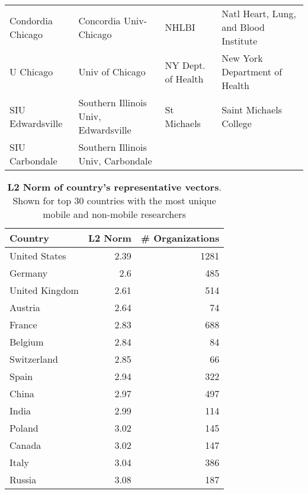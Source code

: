 \documentclass[12pt]{article} %
\begin{document}
\begin{table}[ht]
\begin{adjustwidth}{-2cm}{}
\begin{tabular}{llll}
  Condordia Chicago & Concordia Univ-Chicago & NHLBI & Natl Heart, Lung, and Blood Institute \\
  U Chicago & Univ of Chicago & NY Dept. of Health & New York Department of Health \\
  SIU Edwardsville & Southern Illinois Univ, Edwardsville & St Michaels & Saint Michaels College \\
  SIU Carbondale & Southern Illinois Univ, Carbondale &  &  \\
   \hline
\end{tabular}
\endgroup
\end{adjustwidth}
\end{table}


\newpage

\begin{table}[]
\centering
\caption{\textbf{L2 Norm of country's representative vectors}.
			 Shown for top 30 countries with the most unique mobile and non-mobile researchers}
\label{table:supp:norm}
\begin{tabular}{lrr}
\textbf{Country} & \textbf{L2 Norm} & \textbf{\# Organizations} \\ \hline
United States    & 2.39             & 1281                      \\
Germany          & 2.6              & 485                       \\
United Kingdom   & 2.61             & 514                       \\
Austria          & 2.64             & 74                        \\
France           & 2.83             & 688                       \\
Belgium          & 2.84             & 84                        \\
Switzerland      & 2.85             & 66                        \\
Spain            & 2.94             & 322                       \\
China            & 2.97             & 497                       \\
India            & 2.99             & 114                       \\
Poland           & 3.02             & 145                       \\
Canada           & 3.02             & 147                       \\
Italy            & 3.04             & 386                       \\
Russia           & 3.08             & 187                       \\

\end{tabular}
\end{table}
\end{document}

